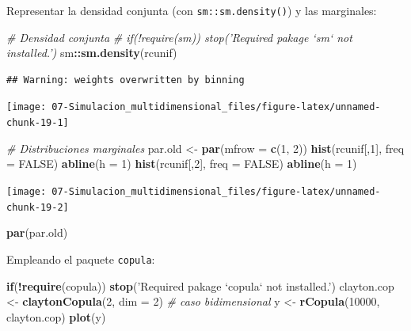 \documentclass[
]{book}
\newenvironment{Shaded}{\begin{snugshade}}{\end{snugshade}}
\newcommand{\CommentTok}[1]{\textcolor[rgb]{0.56,0.35,0.01}{\textit{#1}}}
\newcommand{\ControlFlowTok}[1]{\textcolor[rgb]{0.13,0.29,0.53}{\textbf{#1}}}
\newcommand{\DataTypeTok}[1]{\textcolor[rgb]{0.13,0.29,0.53}{#1}}
\newcommand{\DecValTok}[1]{\textcolor[rgb]{0.00,0.00,0.81}{#1}}
\newcommand{\KeywordTok}[1]{\textcolor[rgb]{0.13,0.29,0.53}{\textbf{#1}}}
\newcommand{\NormalTok}[1]{#1}
\newcommand{\OperatorTok}[1]{\textcolor[rgb]{0.81,0.36,0.00}{\textbf{#1}}}
\newcommand{\OtherTok}[1]{\textcolor[rgb]{0.56,0.35,0.01}{#1}}
\newcommand{\StringTok}[1]{\textcolor[rgb]{0.31,0.60,0.02}{#1}}
\theoremstyle{break}
\theoremstyle{definition}
\theoremstyle{definition}
\theoremstyle{definition}
\theoremstyle{remark}
\begin{document}
\begin{enumerate}
  Representar la densidad conjunta (con \texttt{sm::sm.density()}) y las marginales:

\begin{Shaded}
\begin{Highlighting}[]
\CommentTok{# Densidad conjunta}
\CommentTok{# if(!require(sm)) stop('Required pakage `sm` not installed.')}
\NormalTok{sm}\OperatorTok{::}\KeywordTok{sm.density}\NormalTok{(rcunif)}
\end{Highlighting}
\end{Shaded}

\begin{verbatim}
## Warning: weights overwritten by binning
\end{verbatim}

  \begin{center}\texttt{[image: 07-Simulacion\_multidimensional\_files/figure-latex/unnamed-chunk-19-1]} \end{center}

\begin{Shaded}
\begin{Highlighting}[]
\CommentTok{# Distribuciones marginales}
\NormalTok{par.old <-}\StringTok{ }\KeywordTok{par}\NormalTok{(}\DataTypeTok{mfrow =} \KeywordTok{c}\NormalTok{(}\DecValTok{1}\NormalTok{, }\DecValTok{2}\NormalTok{))}
\KeywordTok{hist}\NormalTok{(rcunif[,}\DecValTok{1}\NormalTok{], }\DataTypeTok{freq =} \OtherTok{FALSE}\NormalTok{)}
\KeywordTok{abline}\NormalTok{(}\DataTypeTok{h =} \DecValTok{1}\NormalTok{)}
\KeywordTok{hist}\NormalTok{(rcunif[,}\DecValTok{2}\NormalTok{], }\DataTypeTok{freq =} \OtherTok{FALSE}\NormalTok{)}
\KeywordTok{abline}\NormalTok{(}\DataTypeTok{h =} \DecValTok{1}\NormalTok{)}
\end{Highlighting}
\end{Shaded}

  \begin{center}\texttt{[image: 07-Simulacion\_multidimensional\_files/figure-latex/unnamed-chunk-19-2]} \end{center}

\begin{Shaded}
\begin{Highlighting}[]
\KeywordTok{par}\NormalTok{(par.old)}
\end{Highlighting}
\end{Shaded}

  Empleando el paquete \texttt{copula}:

\begin{Shaded}
\begin{Highlighting}[]
\ControlFlowTok{if}\NormalTok{(}\OperatorTok{!}\KeywordTok{require}\NormalTok{(copula)) }\KeywordTok{stop}\NormalTok{(}\StringTok{'Required pakage `copula` not installed.'}\NormalTok{)}
\NormalTok{clayton.cop <-}\StringTok{ }\KeywordTok{claytonCopula}\NormalTok{(}\DecValTok{2}\NormalTok{, }\DataTypeTok{dim =} \DecValTok{2}\NormalTok{) }\CommentTok{# caso bidimensional}
\NormalTok{y <-}\StringTok{ }\KeywordTok{rCopula}\NormalTok{(}\DecValTok{10000}\NormalTok{, clayton.cop)}
\KeywordTok{plot}\NormalTok{(y)}
\end{Highlighting}
\end{Shaded}


\end{enumerate}
\end{document}
